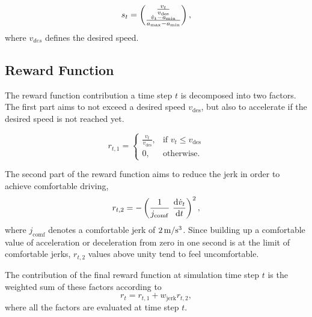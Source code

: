 \documentclass[review]{elsarticle}
\providecommand{\martinc}[1]{}                  %
\providecommand{\sub}[1]{_{\mathrm{#1}}}  %
\providecommand{\3}{{\ss}}
\begin{document}
	\begin{equation}
	\label{eq:stateFree}
	s_t = \begin{pmatrix} \frac{v_t}{v\sub{des}} \\ \frac{\dot{v}_t-a\sub{\rm min}}{a\sub{\rm max} - a\sub{\rm min}}\end{pmatrix},
	\end{equation}
	where $v_{des}$ defines the desired speed.
	\subsection{Reward Function}
	\label{rewardFunctionFree}
	The reward function contribution a time step $t$ is decomposed into two factors. The first part aims to
	not exceed a desired speed $v\sub{des}$, but also to accelerate if the
	desired speed is not reached yet.  
	\martinc{Man sollte auch den Fall $v>v\sub{des}$ ber\"ucksichtigen,
		der z.B. durch Einfahren in ein Streckensegment mit niedrigerem
		Tempolimit (Ortseinfahrt) realisiert wird, aber nicht so
		drastisch/unstetig wie hier, z.B. zweiten Fall durch
		$(v\sub{des}-v)/v\sub{des}$ statt =0 ersetzen}
	
	\begin{equation}
	\label{eq:r1Free}
	r_{t,1}  = 
	\begin{cases}
	\frac{v_t}{v\sub{des}},
	& \text{if } v_t \leq v\sub{des}\\
	0,
	& \text{otherwise}.
	\end{cases}
	\end{equation}
	
	The second part of the reward function aims to reduce the jerk in
	order to achieve comfortable driving, \martinc{No need for dotted
		quantities here; I propose using $j\sub{comf}$} \martinc{Really
		$\dv{a}{t}$ or the second state variable defined in~\eqref{eq:stateFree}?}
	\begin{equation}
	\label{eq:r2Free}
	r_{t,2} = -\left(\frac{1}{j\sub{comf}} \ \dv{\dot{v}_t}{t}\right)^2,
	\end{equation}
	where $j\sub{comf}$ denotes a comfortable jerk of $\unit[2]{m/s^3}$.
	Since building up a comfortable value of acceleration or deceleration
	from zero in one second is at the limit of comfortable jerks, $r_{t,2}$
	values above unity tend to feel uncomfortable.
	
	
	The contribution of the final reward function at simulation time step $t$ is the weighted
	sum of these factors according to
	\begin{equation}
	\label{rt1}
	r_{t} =r_{t,1} + w\sub{jerk} r_{t,2},
	\end{equation}
	where all the factors are evaluated at time step $t$. 
	
\end{document}
